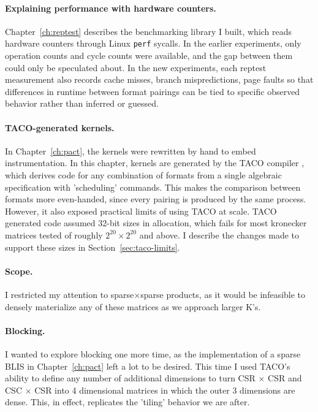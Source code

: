 \paragraph{Explaining performance with hardware counters.}
Chapter~\ref{ch:reptest} describes the benchmarking library I built, which
reads hardware counters through Linux \texttt{perf} sycalls. In the earlier
experiments, only operation counts and cycle counts were available, and
the gap between them could only be speculated about. In the new experiments, each reptest
measurement also records cache misses, branch mispredictions, page faults
so that differences in runtime between format pairings can be tied to specific observed behavior rather than inferred or guessed.

\paragraph{TACO-generated kernels.}
In Chapter~\ref{ch:pact}, the kernels were rewritten by hand to embed
instrumentation. In this chapter, kernels
are generated by the TACO compiler \cite{taco}, which derives code
for any combination of formats from a single algebraic specification with 'scheduling' commands. This makes
the comparison between formats more even-handed, since every pairing is
produced by the same process. However, it also exposed practical limits of using TACO at scale.
TACO generated code assumed 32-bit sizes in allocation, which fails for most kronecker matrices tested of
roughly $2^{20} \times 2^{20}$ and above. I describe the changes made to support these sizes in Section~\ref{sec:taco-limits}.

\paragraph{Scope.}
I restricted my attention to sparse$\times$sparse products, as it would be infeasible to densely materialize any of these matrices as we approach larger K's.

\paragraph{Blocking.}
I wanted to explore blocking one more time, as the implementation of a sparse BLIS in Chapter~\ref{ch:pact} left a lot to be desired. This time I used
TACO's ability to define any number of additional dimensions to turn CSR $\times$ CSR and CSC $\times$ CSR into 4 dimensional matrices in which
the outer 3 dimensions are dense. This, in effect, replicates the 'tiling' behavior we are after.

